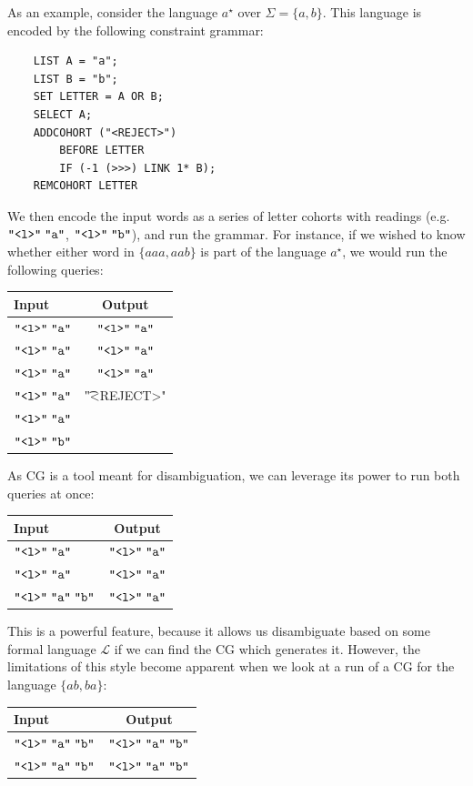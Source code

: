 As an example, consider the language $a^\star$ over $\Sigma = \{a,b\}$.
This language is encoded by the following constraint grammar:
\begin{center}
  \begin{Verbatim}
    LIST A = "a";
    LIST B = "b";
    SET LETTER = A OR B;
    SELECT A;
    ADDCOHORT ("<REJECT>")
        BEFORE LETTER 
        IF (-1 (>>>) LINK 1* B);
    REMCOHORT LETTER
  \end{Verbatim}
\end{center}
We then encode the input words as a series of letter cohorts with readings
(e.g.\ \(\texttt{"<l>"}\;\texttt{"a"}\), \(\texttt{"<l>"}\;\texttt{"b"}\)), and run the grammar.
For instance, if we wished to know whether either word in $\{aaa,aab\}$ is part
of the language $a^\star$, we would run the following queries:
\begin{center}
  \begin{tabular}{l|c}
    \textbf{Input}         & \textbf{Output} \\ \hline
    \(\texttt{"<l>"}\;\texttt{"a"}\) & \(\texttt{"<l>"}\;\texttt{"a"}\) \\
    \(\texttt{"<l>"}\;\texttt{"a"}\) & \(\texttt{"<l>"}\;\texttt{"a"}\) \\
    \(\texttt{"<l>"}\;\texttt{"a"}\) & \(\texttt{"<l>"}\;\texttt{"a"}\) \\ \hline
    \(\texttt{"<l>"}\;\texttt{"a"}\) & \t{"<REJECT>"} \\
    \(\texttt{"<l>"}\;\texttt{"a"}\) \\
    \(\texttt{"<l>"}\;\texttt{"b"}\)
  \end{tabular}
\end{center}
As CG is a tool meant for disambiguation, we can leverage its power to run both
queries at once:
\begin{center}
  \begin{tabular}{l|c}
    \textbf{Input}                  & \textbf{Output} \\ \hline
    \(\texttt{"<l>"}\;\texttt{"a"}\)          & \(\texttt{"<l>"}\;\texttt{"a"}\) \\
    \(\texttt{"<l>"}\;\texttt{"a"}\)          & \(\texttt{"<l>"}\;\texttt{"a"}\) \\
    \(\texttt{"<l>"}\;\texttt{"a"}\;\texttt{"b"}\) & \(\texttt{"<l>"}\;\texttt{"a"}\)
  \end{tabular}
\end{center}
This is a powerful feature, because it allows us disambiguate based on some
formal language $\mathcal{L}$ if we can find the CG which generates it.
However, the limitations of this style become apparent when we look at a run of
a CG for the language $\{ab,ba\}$:
\begin{center}
  \begin{tabular}{l|c}
    \textbf{Input}                  & \textbf{Output} \\ \hline
    \(\texttt{"<l>"}\;\texttt{"a"}\;\texttt{"b"}\) & \(\texttt{"<l>"}\;\texttt{"a"}\;\texttt{"b"}\) \\
    \(\texttt{"<l>"}\;\texttt{"a"}\;\texttt{"b"}\) & \(\texttt{"<l>"}\;\texttt{"a"}\;\texttt{"b"}\) \\
  \end{tabular}
\end{center}
